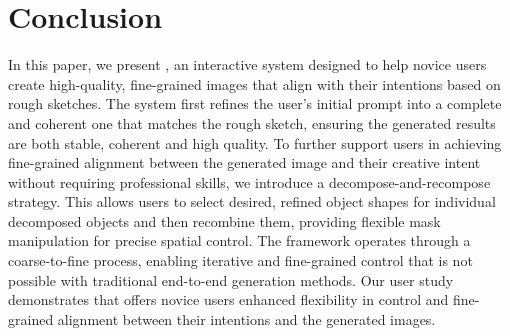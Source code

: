 \section{Conclusion}\label{sec:conclusion}
In this paper, we present \tool, an interactive system designed to help novice users create high-quality, fine-grained images that align with their intentions based on rough sketches. 
The system first refines the user's initial prompt into a complete and coherent one that matches the rough sketch, ensuring the generated results are both stable, coherent and high quality.
To further support users in achieving fine-grained alignment between the generated image and their creative intent without requiring professional skills, we introduce a decompose-and-recompose strategy. 
This allows users to select desired, refined object shapes for individual decomposed objects and then recombine them, providing flexible mask manipulation for precise spatial control.
The framework operates through a coarse-to-fine process, enabling iterative and fine-grained control that is not possible with traditional end-to-end generation methods. 
Our user study demonstrates that \tool offers novice users enhanced flexibility in control and fine-grained alignment between their intentions and the generated images.
